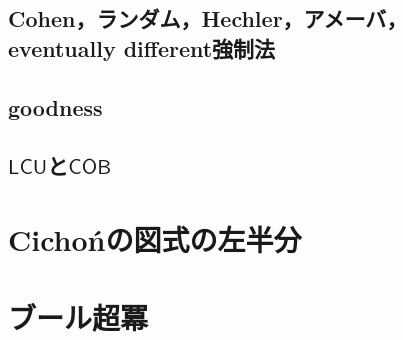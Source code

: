 \documentclass[uplatex,dvipdfmx]{jsarticle}
\newcommand{\LCU}{\mathsf{LCU}}
\newcommand{\COB}{\mathsf{COB}}
\theoremstyle{definition}
\begin{document}
	\subsection{Cohen，ランダム，Hechler，アメーバ，eventually different強制法}
	\subsection{goodness}
	\subsection{$\LCU$と$\COB$}
	
	\section{Cichońの図式の左半分}
	
	\section{ブール超冪}
	
	\nocite{*}
	\printbibliography[title={参考文献}]
\end{document}
